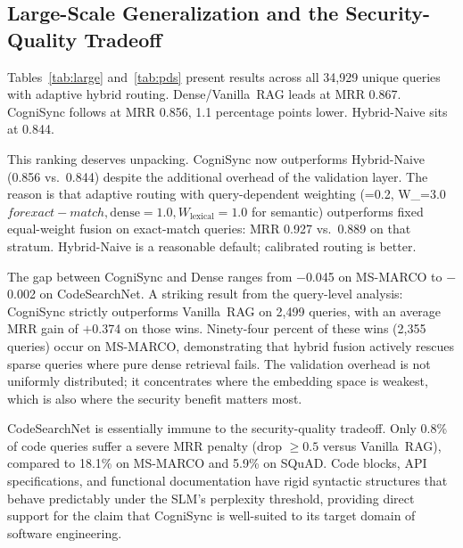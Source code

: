 \documentclass[sigconf,authordraft]{acmart}
\begin{document}
\subsection{Large-Scale Generalization and the Security-Quality Tradeoff}
\label{sec:largescale}

Tables~\ref{tab:large} and~\ref{tab:pds} present results across all
34,929 unique queries with adaptive hybrid routing. Dense/Vanilla~RAG leads at
MRR 0.867. CogniSync follows at MRR 0.856, 1.1 percentage points lower.
Hybrid-Naive sits at 0.844.

This ranking deserves unpacking. CogniSync now outperforms Hybrid-Naive
(0.856 vs.~0.844) despite the additional overhead of the validation layer.
The reason is that adaptive routing with query-dependent weighting
({}=0.2, W_{}=3.0$ for exact-match, {\mathrm{dense}}=1.0, W_{\mathrm{lexical}}=1.0$ for semantic) outperforms
fixed equal-weight fusion on exact-match queries: MRR 0.927 vs.~0.889
on that stratum. Hybrid-Naive is a reasonable default; calibrated routing
is better.

The gap between CogniSync and Dense ranges from $-$0.045 on MS-MARCO
to $-$0.002 on CodeSearchNet. A striking result from the query-level
analysis: CogniSync strictly outperforms Vanilla~RAG on 2,499 queries,
with an average MRR gain of $+$0.374 on those wins. Ninety-four percent
of these wins (2,355 queries) occur on MS-MARCO, demonstrating that hybrid
fusion actively rescues sparse queries where pure dense retrieval fails.
The validation overhead is not uniformly distributed; it concentrates where
the embedding space is weakest, which is also where the security benefit
matters most.

CodeSearchNet is essentially immune to the security-quality tradeoff.
Only 0.8\% of code queries suffer a severe MRR penalty (drop $\geq 0.5$
versus Vanilla~RAG), compared to 18.1\% on MS-MARCO and 5.9\% on SQuAD.
Code blocks, API specifications, and functional documentation have rigid
syntactic structures that behave predictably under the SLM's perplexity
threshold, providing direct support for the claim that CogniSync is
well-suited to its target domain of software engineering.
\end{document}
